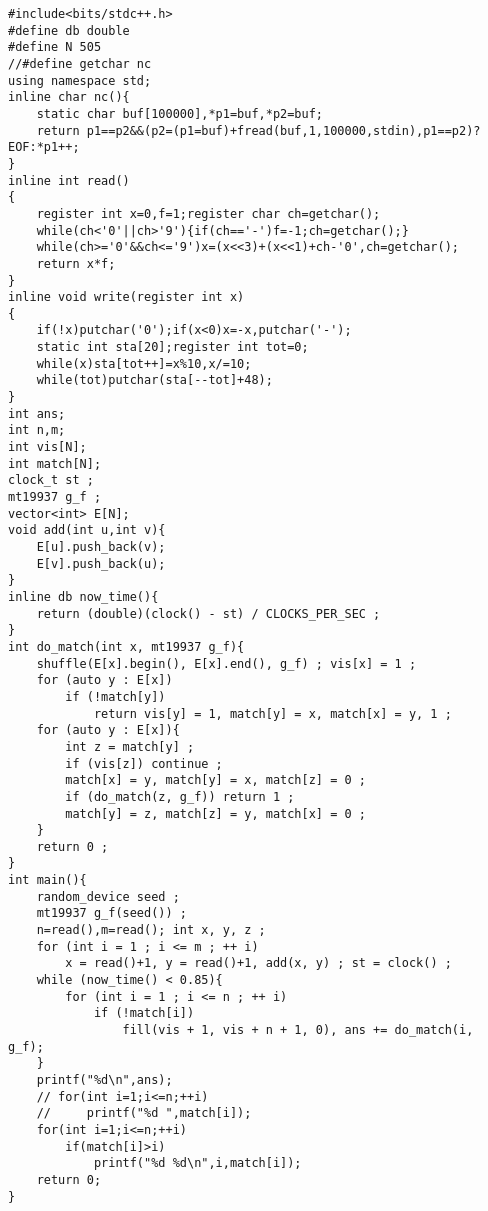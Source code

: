 \begin{verbatim}
#include<bits/stdc++.h>
#define db double
#define N 505
//#define getchar nc
using namespace std;
inline char nc(){
    static char buf[100000],*p1=buf,*p2=buf;
    return p1==p2&&(p2=(p1=buf)+fread(buf,1,100000,stdin),p1==p2)?EOF:*p1++;
}
inline int read()
{
    register int x=0,f=1;register char ch=getchar();
    while(ch<'0'||ch>'9'){if(ch=='-')f=-1;ch=getchar();}
    while(ch>='0'&&ch<='9')x=(x<<3)+(x<<1)+ch-'0',ch=getchar();
    return x*f;
}
inline void write(register int x)
{
    if(!x)putchar('0');if(x<0)x=-x,putchar('-');
    static int sta[20];register int tot=0;
    while(x)sta[tot++]=x%10,x/=10;
    while(tot)putchar(sta[--tot]+48);
}
int ans;
int n,m;
int vis[N];
int match[N];
clock_t st ;
mt19937 g_f ;
vector<int> E[N];
void add(int u,int v){
    E[u].push_back(v);
    E[v].push_back(u);
}
inline db now_time(){
    return (double)(clock() - st) / CLOCKS_PER_SEC ;
}
int do_match(int x, mt19937 g_f){
    shuffle(E[x].begin(), E[x].end(), g_f) ; vis[x] = 1 ;
    for (auto y : E[x])
        if (!match[y])
            return vis[y] = 1, match[y] = x, match[x] = y, 1 ;
    for (auto y : E[x]){
        int z = match[y] ;
        if (vis[z]) continue ;
        match[x] = y, match[y] = x, match[z] = 0 ;
        if (do_match(z, g_f)) return 1 ;
        match[y] = z, match[z] = y, match[x] = 0 ;
    }
    return 0 ;
}
int main(){
    random_device seed ;
    mt19937 g_f(seed()) ;
    n=read(),m=read(); int x, y, z ;
    for (int i = 1 ; i <= m ; ++ i)
        x = read()+1, y = read()+1, add(x, y) ; st = clock() ;
    while (now_time() < 0.85){
        for (int i = 1 ; i <= n ; ++ i)
            if (!match[i])
                fill(vis + 1, vis + n + 1, 0), ans += do_match(i, g_f);
    }
    printf("%d\n",ans);
    // for(int i=1;i<=n;++i)
    //     printf("%d ",match[i]);
    for(int i=1;i<=n;++i)
        if(match[i]>i)
            printf("%d %d\n",i,match[i]);
    return 0;
}
\end{verbatim}
